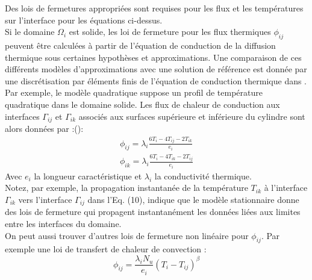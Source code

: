 \documentclass[11pt,a4paper]{scrartcl}%
\begin{document}
	Des lois de fermetures appropriées sont requises pour les flux et les températures sur l'interface pour les équations ci-dessus.\\
	Si le domaine $\Omega_i$ est solide, les loi de fermeture pour les flux thermiques $\phi_{ij}$ peuvent être calculées à partir de l'équation de conduction de la diffusion thermique sous certaines hypothèses et approximations. Une comparaison de ces différents modèles d'approximations avec une solution de référence est donnée par une discrétisation par éléments finis de l'équation de conduction thermique dans . Par exemple, le modèle quadratique     suppose un profil de température quadratique dans le domaine solide. Les flux de chaleur de conduction aux interfaces $\Gamma_{ij}$ et $\Gamma_{ik}$ associés aux surfaces supérieure et inférieure du cylindre sont alors données par :():
	\begin{gather}
		\phi_{ij} = \lambda_i\frac{6T_i - 4T_{ij} - 2T_{ik}}{ e_i}\\
		\phi_{ik} = \lambda_i\frac{6T_i - 4T_{ik} - 2T_{ij}}{ e_i}
	\end{gather}
	Avec $e_i$ la longueur caractéristique et $\lambda_i$ la conductivité thermique.\\
	Notez, par exemple, la propagation instantanée de la température $T_{ik}$ à l'interface $\Gamma_{ik}$ vers l'interface $\Gamma_{ij}$ dans l'Eq. (10), indique que le modèle stationnaire donne des lois de fermeture qui propagent instantanément les données liées aux limites entre
	les interfaces du domaine.\\
	On peut aussi trouver d'autres lois de fermeture non linéaire pour $\phi_{ij}$. Par exemple une loi de transfert de chaleur de convection : 
	\begin{equation}\label{equa11}
	\phi_{ij} =\frac{\lambda_iN_u}{e_i}(T_i - T_{ij})^{\beta}
	\end{equation}
	
\end{document}
